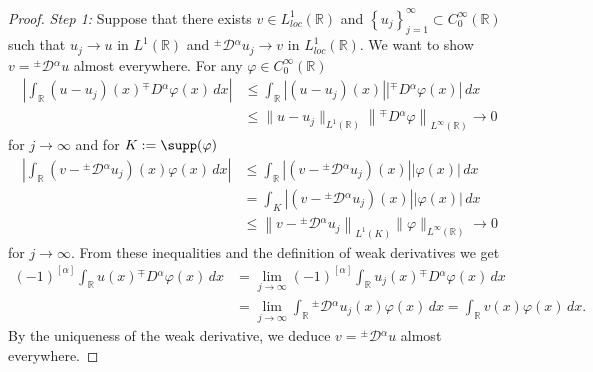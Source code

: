 \documentclass[leqno,final]{siamltex}
\numberwithin{equation}{section}
\renewcommand{\(}{\bigl(}
\renewcommand{\)}{\bigr)}
\newcommand{\R}{\mathbb{R}}
\begin{document}
        \begin{proof}
            {\em Step 1:}  Suppose that there exists $v \in L^{1}_{loc}(\R)$ and $\left\{u_j \right\}_{j=1}^{\infty} \subset C^{\infty}_{0}(\R)$
             such that $u _ j \rightarrow u$ in $L^{1}(\R)$ and ${^{\pm}}{\mathcal{D}}{^{\alpha}}u_j     \rightarrow v$ in $L^{1}_{loc}(\R)$. We want to show $v = {^{\pm}}{\mathcal{D}}{^{\alpha}} u$ almost everywhere. For any $\varphi\in C^\infty_0(\R)$  
            \begin{align*}
                \left| \int_{\R} (u-u_j )(x) {^{\mp}}{D}{^{\alpha}}\varphi(x) \,dx \right| &\leq \int_{\R} \left| (u - u_j)(x) \right| \left| {^{\mp}}{D}{^{\alpha}}\varphi (x) \right|\,dx\\
                &\leq \|u - u_j \|_{L^{1}(\R)} \left\|{^{\mp}}{D}{^{\alpha}} \varphi \right\|_{L^{\infty}(\R)} \to 0   
            \end{align*} 
       for $j\to \infty$ and for $K : = \supp(\varphi)$
            \begin{align*}
                \left| \int_{\R} \left(v - {^{\pm}}{\mathcal{D}}{^{\alpha}} u_j\right)(x) \varphi(x)\,dx  \right| &\leq \int_{\R} \left|\left(v - {^{\pm}}{\mathcal{D}}{^{\alpha}} u_j\right)(x)\right| |\varphi(x)|\,dx\\
                &= \int_{K} \left| \left(v - {^{\pm}}{\mathcal{D}}{^{\alpha}} u_j \right) (x) \right| \left|\varphi(x) \right| \,dx\\
                &\leq \left\| v - {^{\pm}}{\mathcal{D}}{^{\alpha}}u_{j}\right\|_{L^{1}(K)} \| \varphi \|_{L^{\infty}(\R)} \to 0   
            \end{align*}
         for $j\to \infty$. 
         From these inequalities and the definition of weak derivatives we get
            \begin{align*}
                (-1)^{[\alpha]} \int_{\R} u(x) {^{\mp}}{D}{^{\alpha}} \varphi (x)\,dx &= \lim_{j \rightarrow \infty} (-1)^{[\alpha]} \int_{\R} u_j(x) {^{\mp}}{D}{^{\alpha}}\varphi(x)\,dx \\ 
                &=\lim_{j \rightarrow \infty} \int_{\R} {^{\pm}}{\mathcal{D}}{^{\alpha}} u_j (x)  \varphi(x) \,dx 
                = \int_{\R} v(x) \varphi(x)\,dx. 
            \end{align*}
            By the uniqueness of the weak derivative, we deduce $v = {^{\pm}}{\mathcal{D}}{^{\alpha}} u$ almost everywhere.
            

\end{proof}
\end{document}
